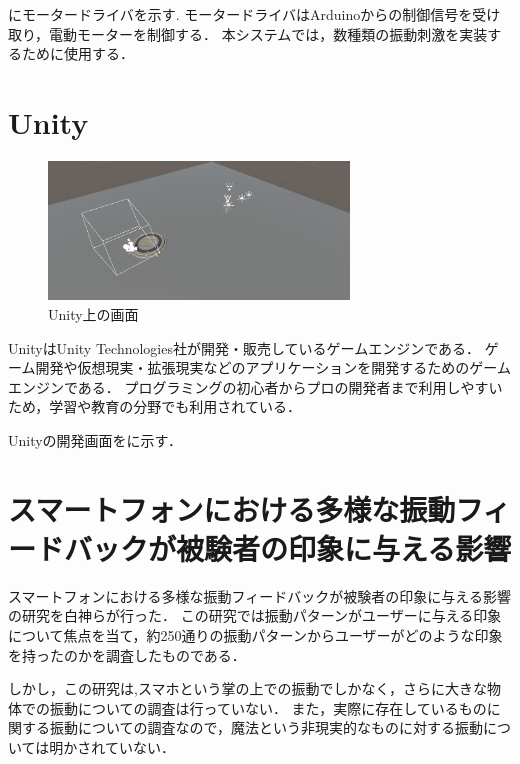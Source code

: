 にモータードライバを示す.
モータードライバはArduinoからの制御信号を受け取り，電動モーターを制御する．
本システムでは，数種類の振動刺激を実装するために使用する．

\section{Unity}

\begin{figure}[h]
\centering
\includegraphics[clip,width=8cm]{./fig/unity_first.png}
\caption{Unity上の画面}\label{unity}
\end{figure}

Unity\cite{unity}はUnity Technologies社が開発・販売しているゲームエンジンである．
ゲーム開発や仮想現実・拡張現実などのアプリケーションを開発するためのゲームエンジンである．
プログラミングの初心者からプロの開発者まで利用しやすいため，学習や教育の分野でも利用されている．

Unityの開発画面をに示す．

\section{スマートフォンにおける多様な振動フィードバックが被験者の印象に与える影響}
スマートフォンにおける多様な振動フィードバックが被験者の印象に与える影響\cite{smart}の研究を白神らが行った．
この研究では振動パターンがユーザーに与える印象について焦点を当て，約250通りの振動パターンからユーザーがどのような印象を持ったのかを調査したものである．


しかし，この研究は,スマホという掌の上での振動でしかなく，さらに大きな物体での振動についての調査は行っていない．
また，実際に存在しているものに関する振動についての調査なので，魔法という非現実的なものに対する振動については明かされていない．





